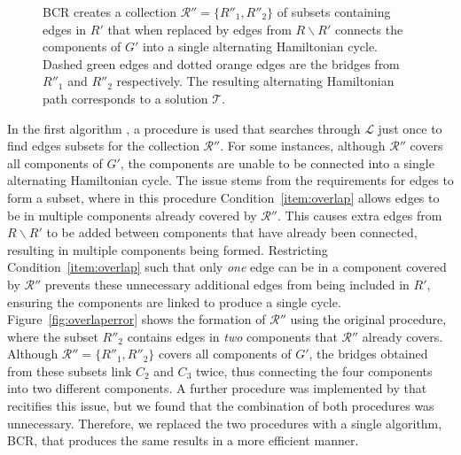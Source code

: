 \documentclass[authoryear]{elsarticle}
\begin{document}
\begin{figure}[H]	
	\centering
	\begin{subfigure}[h]{0.35\textwidth}
		
		\caption{}
		\label{fig:bcrlist}
	\end{subfigure} \hspace{7mm} %
	\begin{subfigure}[h]{0.25\textwidth}
		
		\caption{}
		\label{fig:mpsconnect}
	\end{subfigure} \hspace{7mm} %
	\begin{subfigure}[h]{0.25\textwidth}
		
		\caption{}
		\label{fig:mpscycle}
	\end{subfigure}
	\begin{subfigure}[h]{0.75\textwidth}
		
		\caption{}
		\label{fig:solutionpath}
	\end{subfigure}
	\caption{BCR creates a collection $\mathcal{R}'' = \{R''_1, R''_2\}$ of subsets containing edges in $R'$ that when replaced by edges from $R\backslash R'$ connects the components of $G'$ into a single alternating Hamiltonian cycle. Dashed green edges and dotted orange edges are the bridges from $R''_1$ and $R''_2$ respectively. The resulting alternating Hamiltonian path corresponds to a solution $\mathcal{T}$.}
	\label{fig:bcr}
\end{figure}

\noindent In the first algorithm \citep{becker2010}, a procedure is used that searches through $\mathcal{L}$ just once to find edges subsets for the collection $\mathcal{R}''$. For some instances, although $\mathcal{R}''$ covers all components of $G'$, the components are unable to be connected into a single alternating Hamiltonian cycle. The issue stems from the requirements for edges to form a subset, where in this procedure Condition~\ref{item:overlap} allows edges to be in multiple components already covered by $\mathcal{R}''$. This causes extra edges from $R \backslash R'$ to be added between components that have already been connected, resulting in multiple components being formed. Restricting Condition~\ref{item:overlap} such that only \emph{one} edge can be in a component covered by $\mathcal{R}''$ prevents these unnecessary additional edges from being included in $R'$, ensuring the components are linked to produce a single cycle. Figure~\ref{fig:overlaperror} shows the formation of $\mathcal{R}''$ using the original procedure, where the subset $R''_2$ contains edges in \emph{two} components that $\mathcal{R}''$ already covers. Although $\mathcal{R}'' = \{R''_1, R''_2\}$ covers all components of $G'$, the bridges obtained from these subsets link $C_2$ and $C_3$ twice, thus connecting the four components into two different components. A further procedure was implemented by \citet{hawa2018} that recitifies this issue, but we found that the combination of both procedures was unnecessary. Therefore, we replaced the two procedures with a single algorithm, BCR, that produces the same results in a more efficient manner.
\end{document}
